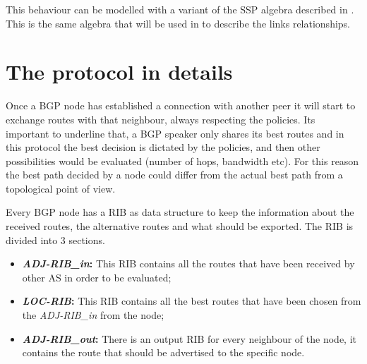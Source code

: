 This behaviour can be modelled with a variant of the \ac{SSP} algebra described
in \cite{daggitt2018rate}.
This is the same algebra that will be used in  to describe the links
relationships.


\section{The protocol in details}
\label{sec:bgp_intro}

Once a \ac{BGP} node has established a connection with another peer it will
start to exchange routes with that neighbour, always respecting the policies.
Its important to underline that, a \ac{BGP} speaker only shares its best routes
and in this protocol the best decision is dictated by the policies, and
then other possibilities would be evaluated (number of hops, bandwidth etc).
For this reason the best path decided by a node could differ from the actual
best path from a topological point of view.

Every \ac{BGP} node has a \ac{RIB} as data structure to keep the information
about the received routes, the alternative routes and what should be exported.
The \ac{RIB} is divided into \num{3} sections.
\begin{itemize}
	\item \textbf{\textit{ADJ-RIB\_in}:} This \ac{RIB} contains all the routes
		that have been received by other \ac{AS} in order to be evaluated;
	\item \textbf{\textit{LOC-RIB}:} This \ac{RIB} contains all the best routes
		that have been chosen from the \textit{ADJ-RIB\_in} from the node;
	\item \textbf{\textit{ADJ-RIB\_out}:} There is an output \ac{RIB} for every
		neighbour of the node, it contains the route that should be advertised
		to the specific node.
\end{itemize}

